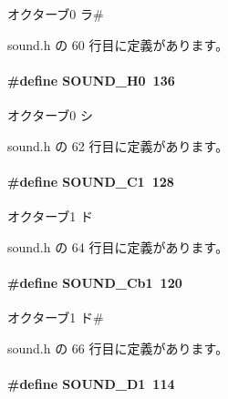 オクターブ0 ラ\# 



 sound.\+h の 60 行目に定義があります。

\paragraph[{S\+O\+U\+N\+D\+\_\+\+H0}]{\setlength{\rightskip}{0pt plus 5cm}\#define S\+O\+U\+N\+D\+\_\+\+H0~136}\label{sound_8h_af77d6e42768c9e8407091ab9237c23e8_af77d6e42768c9e8407091ab9237c23e8}


オクターブ0 シ 



 sound.\+h の 62 行目に定義があります。

\paragraph[{S\+O\+U\+N\+D\+\_\+\+C1}]{\setlength{\rightskip}{0pt plus 5cm}\#define S\+O\+U\+N\+D\+\_\+\+C1~128}\label{sound_8h_acc40de3e4447b500abf6a8f52690eb7a_acc40de3e4447b500abf6a8f52690eb7a}


オクターブ1 ド 



 sound.\+h の 64 行目に定義があります。

\paragraph[{S\+O\+U\+N\+D\+\_\+\+Cb1}]{\setlength{\rightskip}{0pt plus 5cm}\#define S\+O\+U\+N\+D\+\_\+\+Cb1~120}\label{sound_8h_a71cd098d1835193a4082f62c92bd1560_a71cd098d1835193a4082f62c92bd1560}


オクターブ1 ド\# 



 sound.\+h の 66 行目に定義があります。

\paragraph[{S\+O\+U\+N\+D\+\_\+\+D1}]{\setlength{\rightskip}{0pt plus 5cm}\#define S\+O\+U\+N\+D\+\_\+\+D1~114}\label{sound_8h_abc56b27ce3a779cca007c05bd85be4fd_abc56b27ce3a779cca007c05bd85be4fd}


